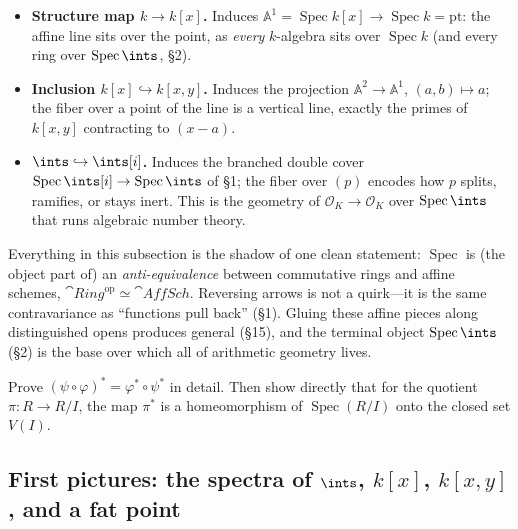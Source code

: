 \documentclass[11pt]{article}
\DeclareMathOperator{\Spec}{Spec}
\begin{document}
\begin{eexample}
\begin{itemize}\setlength{\itemsep}{3pt}
\item \textbf{Structure map $k\to k[x]$.} Induces $\mathbb{A}^1=\Spec k[x]\to\Spec k=\text{pt}$:
the affine line sits over the point, as \emph{every} $k$-algebra sits over $\Spec k$ (and every
ring over $\Spec\ints$, \S2).
\item \textbf{Inclusion $k[x]\hookrightarrow k[x,y]$.} Induces the projection
$\mathbb{A}^2\to\mathbb{A}^1$, $(a,b)\mapsto a$; the fiber over a point of the line is a
vertical line, exactly the primes of $k[x,y]$ contracting to $(x-a)$.
\item \textbf{$\ints\hookrightarrow\ints[i]$.} Induces the branched double cover
$\Spec\ints[i]\to\Spec\ints$ of \S1; the fiber over $(p)$ encodes how $p$ splits, ramifies, or
stays inert. This is the geometry of $\mathcal{O}_K\to\mathcal{O}_K$ over $\Spec\ints$ that
runs algebraic number theory.
\end{itemize}
\end{eexample}

\begin{nnote}
Everything in this subsection is the shadow of one clean statement: $\Spec$ is (the object
part of) an \emph{anti-equivalence} between commutative rings and affine schemes,
$\cat{Ring}^{\mathrm{op}}\simeq\cat{AffSch}$. Reversing arrows is not a quirk---it is the same
contravariance as ``functions pull back'' (\S1). Gluing these affine pieces along
distinguished opens produces general  (\S15), and the terminal object
$\Spec\ints$ (\S2) is the base over which all of arithmetic geometry lives.
\end{nnote}

\begin{xca}
Prove $(\psi\circ\varphi)^\ast=\varphi^\ast\circ\psi^\ast$ in detail. Then show directly that
for the quotient $\pi\colon R\to R/I$, the map $\pi^\ast$ is a homeomorphism of $\Spec(R/I)$
onto the closed set $V(I)$.
\end{xca}

\subsection{First pictures: the spectra of \texorpdfstring{$\ints$, $k[x]$, $k[x,y]$}{Z, k[x], k[x,y]}, and a fat point}
\end{document}
